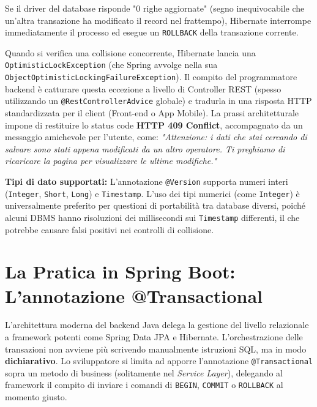 Se il driver del database risponde "0 righe aggiornate" (segno inequivocabile che un'altra transazione ha modificato il record nel frattempo), Hibernate interrompe immediatamente il processo ed esegue un \texttt{ROLLBACK} della transazione corrente.

\begin{observation}
Quando si verifica una collisione concorrente, Hibernate lancia una \texttt{OptimisticLockException} (che Spring avvolge nella sua \texttt{ObjectOptimisticLockingFailureException}). 
Il compito del programmatore backend è catturare questa eccezione a livello di Controller REST (spesso utilizzando un \texttt{@RestControllerAdvice} globale) e tradurla in una risposta HTTP standardizzata per il client (Front-end o App Mobile).
La prassi architetturale impone di restituire lo status code \textbf{HTTP 409 Conflict}, accompagnato da un messaggio amichevole per l'utente, come: \textit{"Attenzione: i dati che stai cercando di salvare sono stati appena modificati da un altro operatore. Ti preghiamo di ricaricare la pagina per visualizzare le ultime modifiche."}
\end{observation}

\begin{tip}
\textbf{Tipi di dato supportati:} L'annotazione \texttt{@Version} supporta numeri interi (\texttt{Integer}, \texttt{Short}, \texttt{Long}) e \texttt{Timestamp}. L'uso dei tipi numerici (come \texttt{Integer}) è universalmente preferito per questioni di portabilità tra database diversi, poiché alcuni DBMS hanno risoluzioni dei millisecondi sui \texttt{Timestamp} differenti, il che potrebbe causare falsi positivi nei controlli di collisione.
\end{tip}

\section{La Pratica in Spring Boot: L'annotazione @Transactional}

L'architettura moderna del backend Java delega la gestione del livello relazionale a framework potenti come Spring Data JPA e Hibernate. L'orchestrazione delle transazioni non avviene più scrivendo manualmente istruzioni SQL, ma in modo \textbf{dichiarativo}. 
Lo sviluppatore si limita ad apporre l'annotazione \texttt{@Transactional} sopra un metodo di business (solitamente nel \textit{Service Layer}), delegando al framework il compito di inviare i comandi di \texttt{BEGIN}, \texttt{COMMIT} o \texttt{ROLLBACK} al momento giusto.

